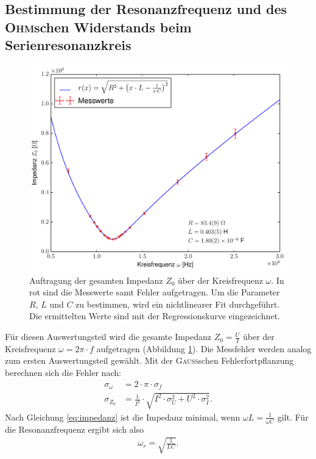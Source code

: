 \documentclass[12pt,a4paper,titlepage,headinclude]{scrartcl}
\numberwithin{equation}{subsection}
\newcommand{\person}[1]{\textsc{#1}}
\begin{document}
\subsection{Bestimmung der Resonanzfrequenz und des \person{Ohm}schen Widerstands beim Serienresonanzkreis}
\label{sec:serienresonanzkreis}
\begin{figure}[h!]
	\centering
	\includegraphics[width=\textwidth]{plot2.pdf}
	\caption{Auftragung der gesamten Impedanz $Z_0$ über der Kreisfrequenz $\omega$. In rot sind die Messwerte samt Fehler aufgetragen. Um die Parameter $R$, $L$ und $C$ zu bestimmen, wird ein nichtlinearer Fit durchgeführt. Die ermittelten Werte sind mit der Regressionskurve eingezeichnet.}
	\label{fig:plot2}
\end{figure}
Für diesen Auswertungsteil wird die gesamte Impedanz $Z_0=\frac{U}{I}$ über der Kreisfrequenz $\omega=2\pi\cdot f$ aufgetragen (Abbildung \ref{fig:plot2}). Die Messfehler werden analog zum ersten Auswertungsteil gewählt. Mit der \person{Gauss}schen Fehlerfortpflanzung berechnen sich die Fehler nach:
\begin{align}
	\sigma_{\omega}&=2 \cdot \pi \cdot \sigma_{f}\\
	\sigma_{Z_0}&=\frac{1}{I^{2}} \cdot \sqrt{I^{2} \cdot \sigma_{U}^{2} + U^{2} \cdot \sigma_{I}^{2}}.
	\label{eq:sigmaomegaz02}
\end{align}
Nach Gleichung \eqref{eq:impedanz} ist die Impedanz minimal, wenn $\omega L =\frac{1}{\omega C}$ gilt. Für die Resonanzfrequenz ergibt sich also
\begin{align}
	\omega_r=\sqrt{\frac{1}{LC}}.
	\label{eq:resonanz}
\end{align}
\end{document}
